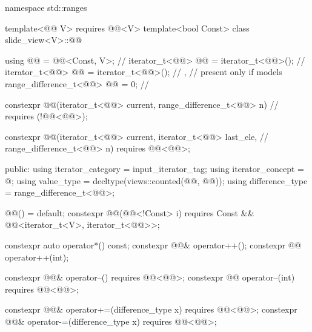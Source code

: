 %
\begin{codeblock}
namespace std::ranges {
  template<@@ V>
    requires @@<V>
  template<bool Const>
  class slide_view<V>::@@ {
    using @@ = @@<Const, V>;                 // \expos
    iterator_t<@@> @@   = iterator_t<@@>();   // \expos
    iterator_t<@@> @@  = iterator_t<@@>();   // \expos,
                                               // present only if  models 
    range_difference_t<@@> @@ = 0;                    // \expos

    constexpr @@(iterator_t<@@> current, range_difference_t<@@> n) // \expos
      requires (!@@<@@>);

    constexpr @@(iterator_t<@@> current, iterator_t<@@> last_ele,  // \expos
                       range_difference_t<@@> n)
      requires @@<@@>;

  public:
    using iterator_category = input_iterator_tag;
    using iterator_concept = @\seebelow@;
    using value_type = decltype(views::counted(@@, @@));
    using difference_type = range_difference_t<@@>;

    @@() = default;
    constexpr @@(@@<!Const> i)
      requires Const && @@<iterator_t<V>, iterator_t<@@>>;

    constexpr auto operator*() const;
    constexpr @@& operator++();
    constexpr @@ operator++(int);

    constexpr @@& operator--() requires @@<@@>;
    constexpr @@ operator--(int) requires @@<@@>;

    constexpr @@& operator+=(difference_type x)
      requires @@<@@>;
    constexpr @@& operator-=(difference_type x)
      requires @@<@@>;

}}
\end{codeblock}
